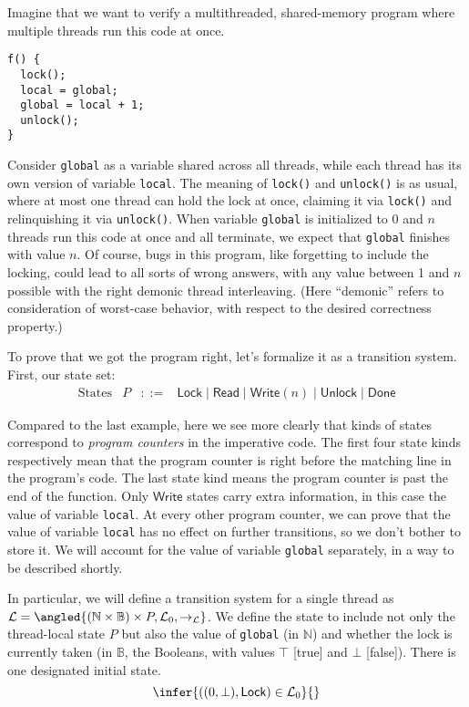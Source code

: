 \documentclass{amsbook}
\theoremstyle{definition}
\theoremstyle{remark}
\numberwithin{section}{chapter}
\numberwithin{equation}{chapter}
\begin{document}
Imagine that we want to verify a multithreaded, shared-memory program where multiple threads run this code at once.
\begin{verbatim}
f() {
  lock();
  local = global;
  global = local + 1;
  unlock();
}
\end{verbatim}

Consider \texttt{global} as a variable shared across all threads, while each thread has its own version of variable \texttt{local}.
The meaning of \texttt{lock()} and \texttt{unlock()} is as usual, where at most one thread can hold the lock at once, claiming it via \texttt{lock()} and relinquishing it via \texttt{unlock()}.
When variable \texttt{global} is initialized to 0 and $n$ threads run this code at once and all terminate, we expect that \texttt{global} finishes with value $n$.
Of course, bugs in this program, like forgetting to include the locking, could lead to all sorts of wrong answers, with any value between 1 and $n$ possible with the right demonic thread interleaving.
(Here ``demonic'' refers to consideration of worst-case behavior, with respect to the desired correctness property.)

\encoding
To prove that we got the program right, let's formalize it as a transition system.  First, our state set:
$$\begin{array}{rrcl}
  \textrm{States} & P &::=& \mathsf{Lock} \mid \mathsf{Read} \mid \mathsf{Write}(n) \mid \mathsf{Unlock} \mid \mathsf{Done}
\end{array}$$

Compared to the last example, here we see more clearly that kinds of states correspond to \emph{program counters} in the imperative code.
The first four state kinds respectively mean that the program counter is right before the matching line in the program's code.
The last state kind means the program counter is past the end of the function.
Only $\mathsf{Write}$ states carry extra information, in this case the value of variable \texttt{local}.
At every other program counter, we can prove that the value of variable \texttt{local} has no effect on further transitions, so we don't bother to store it.
We will account for the value of variable \texttt{global} separately, in a way to be described shortly.

In particular, we will define a transition system for a single thread as $\mathcal L = \angled{(\mathbb N \times \mathbb B) \times P, \mathcal L_0, \to_{\mathcal L}}$.
We define the state to include not only the thread-local state $P$ but also the value of \texttt{global} (in $\mathbb N$) and whether the lock is currently taken (in $\mathbb B$, the Booleans, with values $\top$ [true] and $\bot$ [false]).
There is one designated initial state.
$$\infer{((0, \bot), \mathsf{Lock}) \in \mathcal L_0}{}$$
\end{document}

